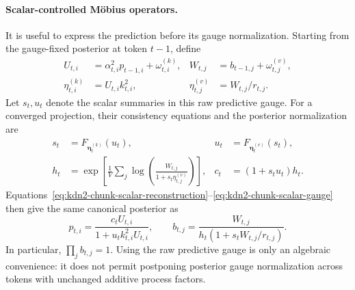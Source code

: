 \documentclass[11pt]{article}
\newcommand{\ve}[1]{\boldsymbol{#1}}
\begin{document}
\paragraph{Scalar-controlled M\"obius operators.}
It is useful to express the prediction before its gauge normalization.  Starting from the
gauge-fixed posterior at token $t-1$, define
\begin{equation}
\begin{aligned}
  U_{t,i}&=\alpha_{t,i}^2p_{t-1,i}+\omega^{(k)}_{t,i},
  & W_{t,j}&=b_{t-1,j}+\omega^{(v)}_{t,j},\\
  \eta^{(k)}_{t,i}&=U_{t,i}k_{t,i}^2,
  & \eta^{(v)}_{t,j}&=W_{t,j}/r_{t,j}.
\end{aligned}
  \label{eq:kdn2-controlled-raw-prediction}
\end{equation}
Let $s_t,u_t$ denote the scalar summaries in this raw predictive gauge.  For a converged
projection, their consistency equations and the posterior normalization are
\begin{equation}
\begin{aligned}
  s_t&=F_{\ve{\eta}^{(k)}_t}(u_t),
  & u_t&=F_{\ve{\eta}^{(v)}_t}(s_t),\\
  h_t&=\exp\!\left[\frac{1}{V}\sum_j
    \log\!\left(\frac{W_{t,j}}{1+s_t\eta^{(v)}_{t,j}}\right)\right],
  & c_t&=(1+s_tu_t)h_t.
\end{aligned}
  \label{eq:kdn2-controlled-consistency}
\end{equation}
Equations~\eqref{eq:kdn2-chunk-scalar-reconstruction}--\eqref{eq:kdn2-chunk-scalar-gauge}
then give the same canonical posterior as
\begin{equation}
  p_{t,i}=\frac{c_tU_{t,i}}{1+u_tk_{t,i}^2U_{t,i}},
  \qquad
  b_{t,j}=\frac{W_{t,j}}{h_t(1+s_tW_{t,j}/r_{t,j})}.
  \label{eq:kdn2-controlled-reconstruction}
\end{equation}
In particular, $\prod_j b_{t,j}=1$.  Using the raw predictive gauge is only an algebraic
convenience: it does not permit postponing posterior gauge normalization across tokens with
unchanged additive process factors.
\end{document}
